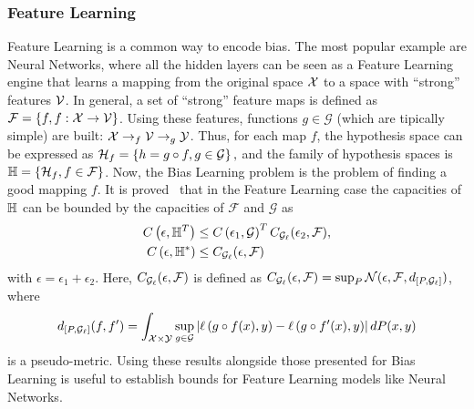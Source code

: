 \subsubsection*{Feature Learning}
Feature Learning is a common way to encode bias. The most popular example are Neural Networks, where all the hidden layers can be seen as a Feature Learning engine that learns a mapping from the original space $\mathcal{X}$ to a space with ``strong'' features $\mathcal{V}$.
In general, a set of ``strong'' feature maps is defined as $\mathcal{F} = \left\{f, f: \mathcal{X} \to \mathcal{V}\right\}$. Using these features, functions $g \in \mathcal{G}$ (which are tipically simple) are built:
$\mathcal{X} \to_f \mathcal{V} \to_g \mathcal{Y}$.
Thus, for each map $f$, the hypothesis space can be expressed as 
$\mathcal{H}_f = \left\{h = g \circ f, g \in \mathcal{G}\right\},$ and the family of hypothesis spaces is 
$\mathbb{H} = \left\{\mathcal{H}_f, f \in \mathcal{F}\right\}$.
Now, the Bias Learning problem is the problem of finding a good mapping $f$.
It is proved~\cite[Theorem~6]{baxter2000model} that in the Feature Learning case the capacities of $\mathbb{H}$ can be bounded by the capacities of $\mathcal{F}$ and $\mathcal{G}$ as
\begin{align*}
    C\left(\epsilon, \mathbb{H}^{T}\right) &\leq C\left(\epsilon_1, \mathcal{G}\right)^T C_{\mathcal{G}_\ell}(\epsilon_2, \mathcal{F}) , \\
    C\left(\epsilon, \mathbb{H}^{*}\right) &\leq C_{\mathcal{G}_\ell}(\epsilon, \mathcal{F})
\end{align*}
with $\epsilon = \epsilon_1 + \epsilon_2 $. Here, $C_{\mathcal{G}_\ell}(\epsilon, \mathcal{F})$ is defined as 
$C_{\mathcal{G}_\ell}(\epsilon, \mathcal{F}) = \sup_P \mathcal{N}(\epsilon, \mathcal{F}, d_{[P, \mathcal{G}_\ell]})$, where
$$ d_{[P, \mathcal{G}_\ell]}(f, f') = \int_{\mathcal{X} \times \mathcal{Y}} \sup_{g \in \mathcal{G}} \left|\ell\left( g \circ f(x), y\right) - \ell\left( g \circ f'(x), y\right)\right| dP(x, y)$$
is a pseudo-metric. Using these results alongside those presented for Bias Learning is useful to establish bounds for Feature Learning models like Neural Networks.

